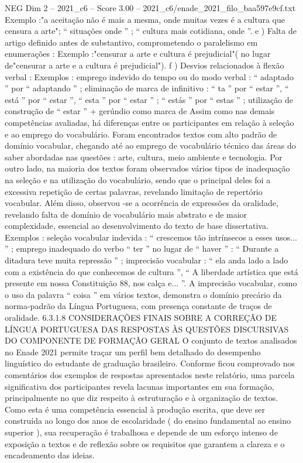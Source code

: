 \begin{textsample}{NEG Dim 2 – 2021\_c6 – Score 3.00 – 2021\_c6/enade\_2021\_filo\_baa597e9cf.txt}
Exemplo :"a aceitação não é mais a mesma, onde muitas vezes é a cultura que censura a arte"; “ situações onde ” ; “ cultura mais cotidiana, onde ”. e ) Falta de artigo definido antes de substantivo, comprometendo o paralelismo em enumerações : Exemplo :"censurar a arte e cultura é prejudicial"( no lugar de"censurar a arte e a cultura é prejudicial"). f ) Desvios relacionados à flexão verbal : Exemplos : emprego indevido do tempo ou do modo verbal : “ adaptado ” por “ adaptando ” ; eliminação de marca de infinitivo : “ ta ” por “ estar ”, “ está ” por “ estar ”, “ esta ” por “ estar ” ; “ estás ” por “ estas ” ; utilização de construção de “ estar ” + gerúndio como marca de Assim como nas demais competências avaliadas, há diferenças entre os participantes em relação à seleção e ao emprego do vocabulário.
Foram encontrados textos com alto padrão de domínio vocabular, chegando até ao emprego de vocabulário técnico das áreas do saber abordadas nas questões : arte, cultura, meio ambiente e tecnologia.
Por outro lado, na maioria dos textos foram observados vários tipos de inadequação na seleção e na utilização do vocabulário, sendo que o principal deles foi a excessiva repetição de certas palavras, revelando limitação de repertório vocabular.
Além disso, observou -se a ocorrência de expressões da oralidade, revelando falta de domínio de vocabulário mais abstrato e de maior complexidade, essencial ao desenvolvimento do texto de base dissertativa.
Exemplos : seleção vocabular indevida : “ crescemos tão intrínsecos a esses usos... ” ; emprego inadequado do verbo “ ter ” no lugar de “ haver ” : “ Durante a ditadura teve muita repressão ” ; imprecisão vocabular : “ ela anda lado a lado com a existência do que conhecemos de cultura ”, “ A liberdade artística que está presente em nossa Constituição 88, nos calça e... ”.
A imprecisão vocabular, como o uso da palavra “ coisa ” em vários textos, demonstra o domínio precário da norma-padrão da Língua Portuguesa, com presença constante de traços de oralidade. 6.3.1.8 CONSIDERAÇÕES FINAIS SOBRE A CORREÇÃO DE LÍNGUA PORTUGUESA DAS RESPOSTAS ÀS QUESTÕES DISCURSIVAS DO COMPONENTE DE FORMAÇÃO GERAL O conjunto de textos analisados no Enade 2021 permite traçar um perfil bem detalhado do desempenho linguístico do estudante de graduação brasileiro.
Conforme ficou comprovado nos comentários dos exemplos de respostas apresentados neste relatório, uma parcela significativa dos participantes revela lacunas importantes em sua formação, principalmente no que diz respeito à estruturação e à organização de textos.
Como esta é uma competência essencial à produção escrita, que deve ser construída ao longo dos anos de escolaridade ( do ensino fundamental ao ensino superior ), sua recuperação é trabalhosa e depende de um esforço intenso de exposição a textos e de reflexão sobre os requisitos que garantem a clareza e o encadeamento das ideias.

\end{textsample}
